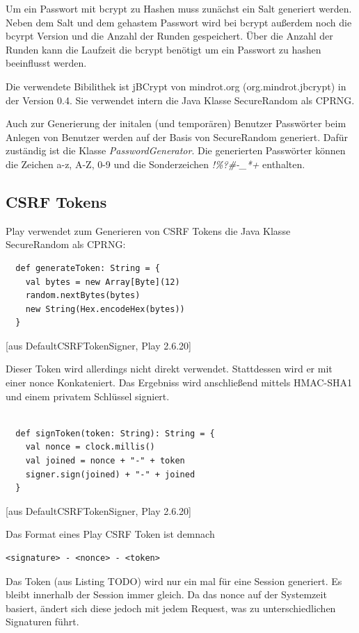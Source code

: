 \documentclass[12pt,DIV14,BCOR10mm,a4paper,twoside,parskip=half-,headsepline,headinclude,english,ngerman,bibliography=totocnumbered]{scrreprt}
\begin{document}
Um ein Passwort mit bcrypt zu Hashen muss zunächst ein Salt generiert werden. Neben dem Salt und dem gehastem Passwort wird bei bcrypt außerdem noch die bcyrpt Version und die Anzahl der Runden gespeichert. Über die Anzahl der Runden kann die Laufzeit die bcrypt benötigt um ein Passwort zu hashen beeinflusst werden.

Die verwendete Bibilithek ist jBCrypt von mindrot.org (org.mindrot.jbcrypt) in der Version 0.4. Sie verwendet intern die Java Klasse SecureRandom als CPRNG.

Auch zur Generierung der initalen (und temporären) Benutzer Passwörter beim Anlegen von Benutzer werden auf der Basis von SecureRandom generiert. Dafür zuständig ist die Klasse \textit{PasswordGenerator}. Die generierten Passwörter können die Zeichen a-z, A-Z, 0-9 und die Sonderzeichen \textit{!\%?\#-\_*+} enthalten.

\subsection{CSRF Tokens}
Play verwendet zum Generieren von CSRF Tokens die Java Klasse SecureRandom als CPRNG:

\begin{lstlisting}
  def generateToken: String = {
    val bytes = new Array[Byte](12)
    random.nextBytes(bytes)
    new String(Hex.encodeHex(bytes))
  }
\end{lstlisting}
[aus DefaultCSRFTokenSigner, Play 2.6.20]

Dieser Token wird allerdings nicht direkt verwendet. Stattdessen wird er mit einer nonce Konkateniert. Das Ergebniss wird anschließend mittels HMAC-SHA1 und einem privatem Schlüssel signiert.

\begin{lstlisting}

  def signToken(token: String): String = {
    val nonce = clock.millis()
    val joined = nonce + "-" + token
    signer.sign(joined) + "-" + joined
  }
\end{lstlisting}

[aus DefaultCSRFTokenSigner, Play 2.6.20]

Das Format eines Play CSRF Token ist demnach
\begin{lstlisting}
<signature> - <nonce> - <token>
\end{lstlisting}


Das Token (aus Listing TODO) wird nur ein mal für eine Session generiert. Es bleibt innerhalb der Session immer gleich. Da das nonce auf der Systemzeit basiert, ändert sich diese jedoch mit jedem Request, was zu unterschiedlichen Signaturen führt.
\end{document}
